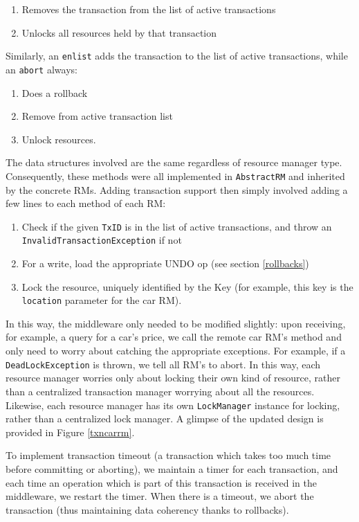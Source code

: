\documentclass[a4paper]{article}
\begin{document}
\begin{enumerate}
 \item Removes the transaction from the list of active transactions 
 \item Unlocks all resources held by that transaction
\end{enumerate}

Similarly, an \texttt{enlist} adds the transaction to the list of active transactions, while an \texttt{abort} always:

\begin{enumerate}
\item Does a rollback
\item Remove from active transaction list
\item Unlock resources.
\end{enumerate}

The data structures involved are the same regardless of resource manager type. Consequently, these methods were all implemented in \texttt{AbstractRM} and inherited by the concrete RMs. Adding transaction support then simply involved adding a few lines to each method of each RM:

\begin{enumerate}
 \item Check if the given \texttt{TxID} is in the list of active transactions, and throw an \texttt{InvalidTransactionException} if not
 \item For a write, load the appropriate UNDO op (see section \ref{rollbacks})
 \item Lock the resource, uniquely identified by the Key (for example, this key is the \texttt{location} parameter for the car RM).
\end{enumerate}

In this way, the middleware only needed to be modified slightly: upon receiving, for example, a query for a car's price, we call the remote car RM's method and only need to worry about catching the appropriate exceptions. For example, if a 
\texttt{DeadLockException} is thrown, we tell all RM's to abort. In this way, each resource manager worries only about locking their own kind of resource, rather than a centralized transaction manager worrying about all the resources.
Likewise, each resource manager has its own \texttt{LockManager} instance for locking, rather than a centralized lock manager. A glimpse of the updated design is provided in Figure \ref{txncarrm}.

To implement transaction timeout (a transaction which takes too much time before committing or aborting), we maintain a timer for each transaction, and each time an operation which is part of this transaction is received in the middleware, we restart the timer. When there is a timeout, we abort the transaction (thus maintaining data coherency thanks to rollbacks).
\end{document}
